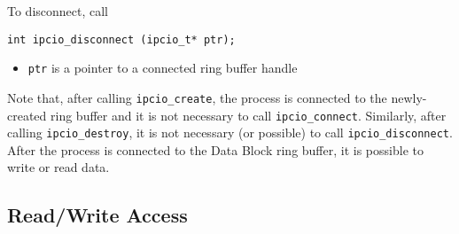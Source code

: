 To disconnect, call
\begin{verbatim}
int ipcio_disconnect (ipcio_t* ptr);
\end{verbatim}
\vspace{-6mm}
\begin{itemize}
\item {\tt ptr} is a pointer to a connected ring buffer handle
\end{itemize}
Note that, after calling {\tt ipcio\_create}, the process is connected
to the newly-created ring buffer and it is not necessary to call 
{\tt ipcio\_connect}.  Similarly, after calling {\tt ipcio\_destroy},
it is not necessary (or possible) to call {\tt ipcio\_disconnect}.
After the process is connected to the Data Block ring buffer, it is
possible to write or read data.

\subsection{Read/Write Access}

